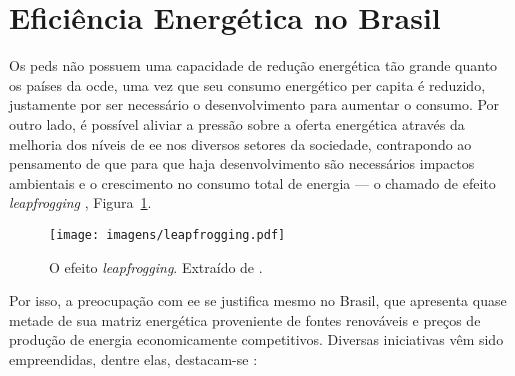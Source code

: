 \section{Eficiência Energética no Brasil}
\label{sec:ee_brasil}

Os \glspl{ped} não possuem uma capacidade de redução energética tão grande
quanto os países da \gls{ocde}, uma vez que seu consumo energético per capita é
reduzido, justamente por ser necessário o desenvolvimento para aumentar o
consumo. Por outro lado, é possível aliviar a pressão sobre a
oferta energética através da melhoria dos níveis de \gls{ee} nos
diversos setores da sociedade, contrapondo ao pensamento de que para que
haja desenvolvimento são necessários impactos ambientais e o crescimento no
consumo total de energia --- o chamado de efeito \emph{leapfrogging}
\cite{goldemberg}, Figura~\ref{fig:leapfrogging}. 

\begin{figure}[h!t]
\centering
\texttt{[image: imagens/leapfrogging.pdf]}
\caption[O efeito \emph{leapfrogging}.]
{O efeito \emph{leapfrogging}. Extraído de \cite{goldemberg}.}
\label{fig:leapfrogging}
\end{figure}

Por isso, a preocupação com \gls{ee} se justifica mesmo no Brasil, 
que apresenta quase metade de sua matriz energética proveniente de fontes 
renováveis e preços de produção de energia economicamente competitivos.
Diversas iniciativas vêm sido empreendidas, dentre elas, destacam-se
\cite{pnef,pne30_eff_energ,epe_demanda_2012,epe_slides_eficiencia}:

